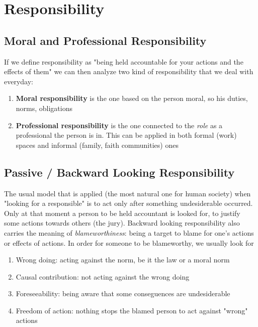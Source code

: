 \documentclass{article}
\begin{document}
	\section{Responsibility}
		\subsection{Moral and Professional Responsibility}
			If we define responsibility as "being held accountable for your actions and the effects of them" we can then analyze two kind of responsibility that we deal with everyday:
			\begin{enumerate}
				\item \textbf{Moral responsibility} is the one based on the person moral, so his duties, norms, obligations
				\item \textbf{Professional responsibility} is the one connected to the \textit{role} as a professional the person is in. This can be applied in both formal (work) spaces and informal (family, faith communities) ones
			\end{enumerate}

		\subsection{Passive / Backward Looking Responsibility}
			The usual model that is applied (the most natural one for human society) when "looking for a responsible" is to act only after something undesiderable occurred. Only at that moment a person to be held accountant is looked for, to justify some actions towards others (the jury). Backward looking responsibility also carries the meaning of \textit{blameworthiness}: being a target to blame for one's actions or effects of actions. In order for someone to be blameworthy, we usually look for
			\begin{enumerate}
				\item Wrong doing: acting against the norm, be it the law or a moral norm
				\item Causal contribution: not acting against the wrong doing
				\item Foreseeability: being aware that some conseguences are undesiderable
				\item Freedom of action: nothing stops the blamed person to act against "wrong" actions
			\end{enumerate}
\end{document}
